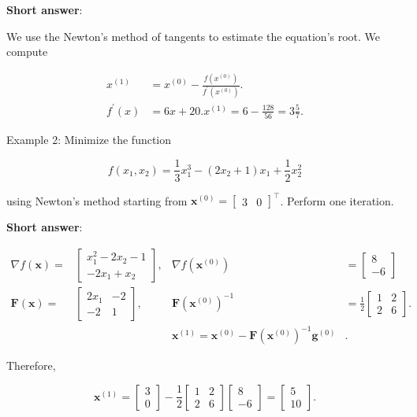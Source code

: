 \textbf{Short answer}:

We use the Newton's method of tangents to estimate the equation's root. We compute

\[
	\begin{aligned}
		x^{(1)} & =x^{(0)}-\frac{f\left(x^{(0)}\right)}{f^{\prime}\left(x^{(0)}\right)} . \\
		f^{\prime}(x) & =6 x+20 . x^{(1)}=6-\frac{128}{56}=3 \frac{5}{7} .
	\end{aligned}
\]

Example 2: Minimize the function

\[
	f\left(x_{1}, x_{2}\right)=\frac{1}{3} x_{1}^{3}-\left(2 x_{2}+1\right) x_{1}+\frac{1}{2} x_{2}^{2}
\]

using Newton's method starting from \(\boldsymbol{x}^{(0)}=\left[\begin{array}{ll}3 & 0\end{array}\right]^{\top}\). Perform one iteration.

\textbf{Short answer}:

\[
	\begin{aligned}
		\nabla f(\boldsymbol{x})= & \left[\begin{array}{c}
				x_{1}^{2}-2 x_{2}-1 \\
				-2 x_{1}+x_{2}
			\end{array}\right], & \nabla f\left(\boldsymbol{x}^{(0)}\right) & =\left[\begin{array}{c}
				8 \\
				-6
			\end{array}\right]   \\
		\boldsymbol{F}(\boldsymbol{x})= & \left[\begin{array}{cc}
				2 x_{1} & -2 \\
				-2 & 1
			\end{array}\right], & \boldsymbol{F} \left(\boldsymbol{x}^{(0)}\right)^{-1} & =\frac{1}{2}\left[\begin{array}{ll}
				1 & 2 \\
				2 & 6
			\end{array}\right] .  \\
		&  & \boldsymbol{x}^{(1)}=\boldsymbol{x}^{(0)}-\boldsymbol{F}\left(\boldsymbol{x}^{(0)}\right)^{-1} \boldsymbol{g}^{(0)} & .
	\end{aligned}
\]

Therefore,

\[
	\boldsymbol{x}^{(1)}=\left[\begin{array}{l}
		3 \\
		0
	\end{array}\right]-\frac{1}{2}\left[\begin{array}{ll}
		1 & 2 \\
		2 & 6
	\end{array}\right]\left[\begin{array}{c}
		8 \\
		-6
	\end{array}\right]=\left[\begin{array}{c}
		5 \\
		10
	\end{array}\right] .
\]

